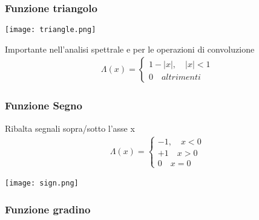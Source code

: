     \subsubsection{Funzione triangolo}
    
    \begin{minipage}{.4\textwidth}
        \begin{center}
           \texttt{[image: triangle.png]}
        \end{center}
    \end{minipage}
    \begin{minipage}{.5\textwidth}
        Importante nell’analisi spettrale e per le operazioni di convoluzione
        \begin{align*}
            \Lambda(x)=\begin{cases}
                1-|x|, \quad |x|<1\\
                0\quad altrimenti
            \end{cases}
        \end{align*}
    \end{minipage}
    
    \noindent
    \subsubsection{Funzione Segno}
    
    \begin{minipage}{.5\textwidth}
        Ribalta segnali sopra/sotto l’asse x
        \begin{align*}
            \Lambda(x)=\begin{cases}
                -1, \quad x<0\\
                +1\quad x>0\\
                0\quad x=0
            \end{cases}
        \end{align*}
    \end{minipage}
    \begin{minipage}{.4\textwidth}
        \begin{center}
           \texttt{[image: sign.png]}
        \end{center}
    \end{minipage}
    
     \noindent
    \subsubsection{Funzione gradino}
    
